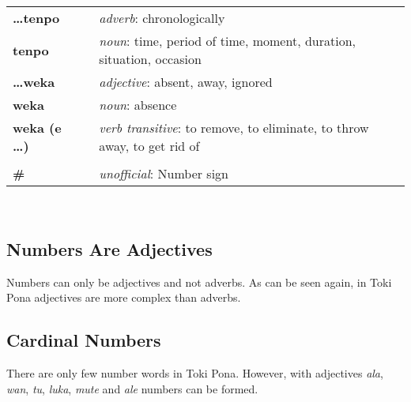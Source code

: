 \begin{supertabular}{p{2,5cm}|ll}
\textbf{\dots tenpo} && \textit{adverb}: chronologically \\ %
\textbf{tenpo} && \textit{noun}: time, period of time, moment, duration, situation, occasion \\ %
%
\textbf{\dots weka} && \textit{adjective}: absent, away, ignored \\ %
\textbf{weka} && \textit{noun}: absence \\ %
\textbf{weka (e \dots)} && \textit{verb transitive}: to remove, to eliminate, to throw away, to get rid of \\ %
 && \\ %
%
\index{\#}
\textbf{\#} && \textit{unofficial}: Number sign  \\ %
%
\end{supertabular} \\
%
%
%
\newpage
%
\subsection*{Numbers Are Adjectives}
%
%
Numbers can only be adjectives and not adverbs. 
As can be seen again, in Toki Pona adjectives are more complex than adverbs. 
%

\subsection*{Cardinal Numbers}
%
There are only few number words in Toki Pona.
However, with adjectives \textit{ala}, \textit{wan}, \textit{tu}, \textit{luka}, \textit{mute} and \textit{ale} numbers can be formed.

